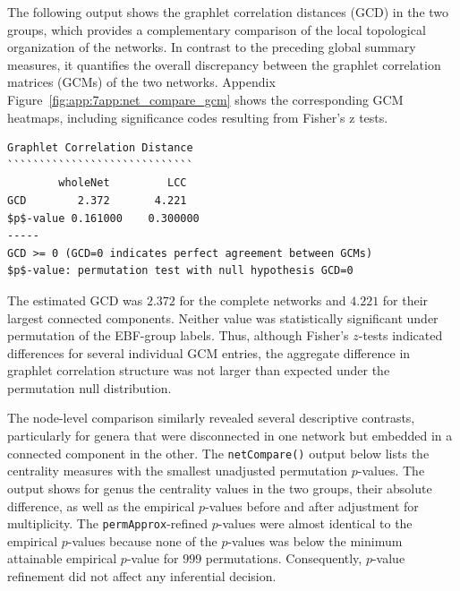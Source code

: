 The following output shows the graphlet correlation distances (GCD) in the two groups, which provides a complementary comparison of the local topological organization of the networks. In contrast to the preceding global summary measures, it quantifies the overall discrepancy between the graphlet correlation matrices (GCMs) of the two networks. Appendix Figure~\ref{fig:app:7app:net_compare_gcm} shows the corresponding GCM heatmaps, including significance codes resulting from Fisher's z tests.

\begin{Verbatim}[fontsize=\footnotesize]
Graphlet Correlation Distance
`````````````````````````````
        wholeNet         LCC  
GCD        2.372       4.221  
$p$-value 0.161000    0.300000  
-----
GCD >= 0 (GCD=0 indicates perfect agreement between GCMs)
$p$-value: permutation test with null hypothesis GCD=0
\end{Verbatim}

The estimated GCD was $2.372$ for the complete networks and $4.221$ for their largest connected components. Neither value was statistically significant under permutation of the EBF-group labels. Thus, although Fisher's $z$-tests indicated differences for several individual GCM entries, the aggregate difference in graphlet correlation structure was not larger than expected under the permutation null distribution. 

The node-level comparison similarly revealed several descriptive contrasts, particularly for genera that were disconnected in one network but embedded in a connected component in the other. The \texttt{netCompare()} output below lists the centrality measures with the smallest unadjusted permutation $p$-values. The output shows for genus the centrality values in the two groups, their absolute difference, as well as the empirical $p$-values before and after adjustment for multiplicity. The \texttt{permApprox}-refined $p$-values were almost identical to the empirical $p$-values because none of the $p$-values was below the minimum attainable empirical $p$-value for $999$ permutations. Consequently, $p$-value refinement did not affect any inferential decision.

